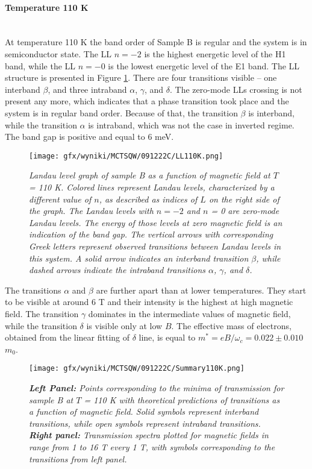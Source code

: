 \documentclass[titlepage,a4paper]{book}
\newcommand{\wciecie}{\quad\phantom{v}}
\newcommand{\myparagraph}[1]{\paragraph{#1}\mbox{}\\}
\begin{document}
\clearpage
\myparagraph{Temperature 110 K}
\wciecie
At temperature 110 K the band order of Sample B is regular and the system is in semiconductor state. The LL $n = -2$ is the highest energetic level of the H1 band, while the LL $n = -0$ is the lowest energetic level of the E1 band. The LL structure is presented in Figure \ref{fig:LL_SQW_110K}. There are four transitions visible -- one interband $\beta$, and three intraband $\alpha$, $\gamma$, and $\delta$. The zero-mode LLs crossing is not present any more, which indicates that a phase transition took place and the system is in regular band order. Because of that, the transition $\beta$ is interband, while the transition $\alpha$ is intraband, which was not the case in inverted regime. The band gap is positive and equal to 6 meV.

\begin{figure}[ht]
	\centering
	\texttt{[image: gfx/wyniki/MCTSQW/091222C/LL110K.png]}
	\vspace{-10pt}
	\caption{\textit{Landau level graph of sample B as a function of magnetic field at $T$ = 110 K. Colored lines represent Landau levels, characterized by a different value of $n$, as described as indices of $L$ on the right side of the graph. The Landau levels with $n = -2$ and $n$ = 0 are zero-mode Landau levels. The energy of those levels at zero magnetic field is an indication of the band gap. The vertical arrows with corresponding Greek letters represent observed transitions between Landau levels in this system. A solid arrow indicates an interband transition $\beta$, while dashed arrows indicate the intraband transitions $\alpha$, $\gamma$, and $\delta$.}}
	\label{fig:LL_SQW_110K}
\end{figure}

The transitions $\alpha$ and $\beta$ are further apart than at lower temperatures. They start to be visible at around 6 T and their intensity is the highest at high magnetic field. The transition $\gamma$ dominates in the intermediate values of magnetic field, while the transition $\delta$ is visible only at low $B$. The effective mass of electrons, obtained from the linear fitting of $\delta$ line, is equal to $m^* = eB/\omega_c = 0.022 \pm 0.010$ $m_0$.

\begin{figure}[H]
	\centering
	\texttt{[image: gfx/wyniki/MCTSQW/091222C/Summary110K.png]}
	\vspace{-10pt}
	\caption{\textit{\textbf{Left Panel:} Points corresponding to the minima of transmission for sample B at $T$ = 110 K with theoretical predictions of transitions as a function of magnetic field. Solid symbols represent interband transitions, while open symbols represent intraband transitions. \textbf{Right panel:} Transmission spectra plotted for magnetic fields in range from 1 to 16 T every 1 T, with symbols corresponding to the transitions from left panel.}}
	\label{fig:Summary_SQW_110K}
\end{figure}
\end{document}
